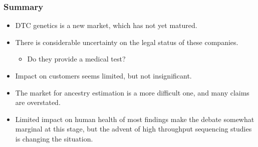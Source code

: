 \documentclass{beamer}
\begin{document}
\begin{frame}
  \frametitle{Summary}
  \begin{itemize}
  \item DTC genetics is a new market, which has not yet matured.
  \item There is considerable uncertainty on the legal status of these companies.
    \begin{itemize}
    \item Do they provide a medical test?
    \end{itemize}
  \item Impact on customers seems limited, but not insignificant.
  \item The market for ancestry estimation is a more difficult one, and many claims are overstated.
  \item Limited impact on human health of most findings make the debate somewhat marginal at this stage, but the advent of high throughput sequencing studies is changing the situation.
  \end{itemize}
\end{frame}
\end{document}
